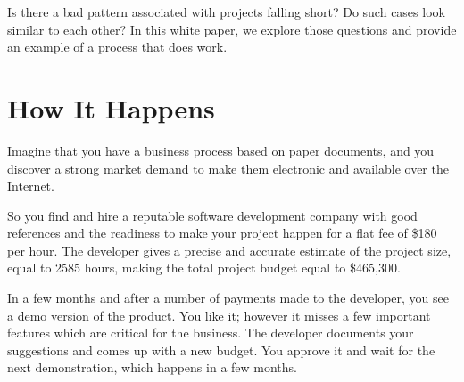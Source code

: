 \documentclass[12pt,letterpaper,oneside]{article}
\newcommand{\enru}[2]{#1}
\begin{document}
    \enru{
        Is there a bad pattern associated with projects falling short? Do such cases
        look similar to each other? In this white paper, we explore those questions and provide an example of a process that does work.
    }{
        Похожи ли провальные проекты друг на друга и можно
        ли обнаружить единый сценарий этих неудач?
    }







\addcontentsline{toc}{section}{\enru{How It Happens}{Как это случается?}}
\section*{\enru{How It Happens}{Как это случается?}}

    \enru{
        Imagine that you have a business process based on paper documents, and
        you discover a strong market demand to make them electronic and available over the Internet.
    }{
        Представьте, что Вы собираетесь автоматизировать и компьютеризировать
        существующие бизнес процессы, создав информационную систему предприятия.
    }

    \enru{
        So you find and hire a reputable software development company
        with good references and the readiness to make your project happen
        for a flat fee of \$180 per hour. The developer gives a precise and accurate
        estimate of the project size, equal to 2585 hours, making the total
        project budget equal to \$465,300.
    }{
        Вы находите и нанимаете разработчика информационной системы,
        успешную компанию с многолетней репутацией, готовой выполнить
        работы за \$180 долларов в час. Разработчик оценивает объем
        работы в 2585 часов. Общий бюджет проекта составляет \$465.300.
    }

    \enru{
        In a few months and after a number of payments made to the developer, you see
        a demo version of the product. You like it; however it misses
        a few important features which are critical for the business.
        The developer documents your suggestions and comes up with a new budget.
        You approve it and wait for the next demonstration, which happens in
        a few months.
    }{
        Через несколько месяцев и после нескольких платежей разработчику
        Вы получаете демо-версию продукта. Она выглядит привлекательно,
        однако в ней нехватает ряда важных функций. Разработчик регистрирует
        Ваши пожелания и предлагает на утверждение новые сроки и новый бюджет.
        Вы утверждаете их и ожидаете следующей демонстрации, через несколько
        месяцев.
    }
\end{document}
